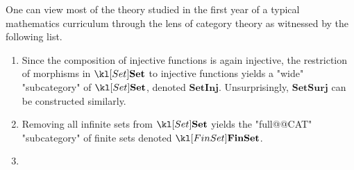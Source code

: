 \documentclass[main.tex]{subfiles}
\begin{document}
\begin{exmps}\label{exmp:subcatSet}
	One can view most of the theory studied in the first year of a typical mathematics curriculum through the lens of category theory as witnessed by the following list.
	\begin{enumerate}
		\item Since the composition of injective functions is again injective, the restriction of morphisms in $\catSet$ to injective functions yields a "wide" "subcategory" of $\catSet$, denoted $\mathbf{SetInj}$. Unsurprisingly, $\mathbf{SetSurj}$ can be constructed similarly.
		\item Removing all infinite sets from $\catSet$ yields the "full@@CAT" "subcategory" of finite sets denoted $\catFinSet$.
		\item %
	\end{enumerate}
\end{exmps}
\end{document}
